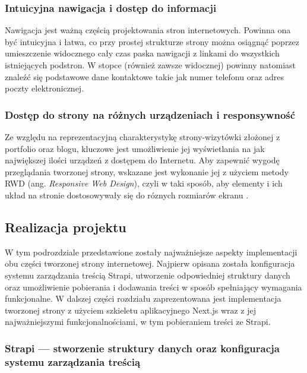\documentclass[12pt]{article}
\numberwithin{figure}{section}
\begin{document}
\begin{sloppypar}
\subsubsection*{Intuicyjna nawigacja i dostęp do informacji}

Nawigacja jest ważną częścią projektowania stron internetowych. Powinna ona być intuicyjna i łatwa, co przy prostej strukturze strony można osiągnąć poprzez umieszczenie widocznego cały czas paska nawigacji z linkami do wszystkich istniejących podstron. W stopce (również zawsze widocznej) powinny natomiast znaleźć się podstawowe dane kontaktowe takie jak numer telefonu oraz adres poczty elektronicznej. 

\subsubsection*{Dostęp do strony na różnych urządzeniach i responsywność}

Ze względu na reprezentacyjną charakterystykę strony-wizytówki złożonej z portfolio oraz blogu, kluczowe jest umożliwienie jej wyświetlania na jak największej ilości urządzeń z dostępem do Internetu. Aby zapewnić wygodę przeglądania tworzonej strony, wskazane jest wykonanie jej z użyciem metody RWD (ang. \textit{Responsive Web Design}), czyli w taki sposób, aby elementy i ich układ na stronie dostosowywały się do róznych rozmiarów ekranu \cite{rwd}. 


\subsection{Realizacja projektu} \label{realizacja}

W tym podrozdziale przedstawione zostały najważniejsze aspekty implementacji obu części tworzonej strony internetowej. Najpierw opisana została konfiguracja systemu zarządzania treścią Strapi, utworzenie odpowiedniej struktury danych oraz umożliwienie pobierania i dodawania treści w sposób spełniający wymagania funkcjonalne. W dalszej części rozdziału zaprezentowana jest implementacja tworzonej strony z użyciem szkieletu aplikacyjnego Next.js wraz z jej najważniejszymi funkcjonalnościami, w tym pobieraniem treści ze Strapi.

\subsubsection{Strapi --- stworzenie struktury danych oraz konfiguracja systemu zarządzania treścią}


\end{sloppypar}
\end{document}
